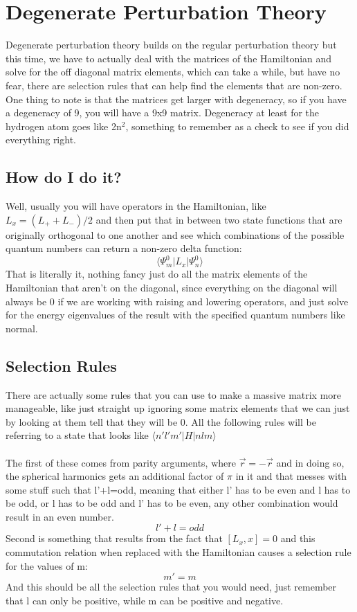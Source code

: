 \documentclass[garamond]{article}
\begin{document}
\section{Degenerate Perturbation Theory}
Degenerate perturbation theory builds on the regular perturbation theory but this time, we have to actually deal with the matrices of the Hamiltonian and solve for the off diagonal matrix elements, which can take a while, but have no fear, there are selection rules that can help find the elements that are non-zero. One thing to note is that the matrices get larger with degeneracy, so if you have a degeneracy of 9, you will have a 9x9 matrix. Degeneracy at least for the hydrogen atom goes like 2n$^2$, something to remember as a check to see if you did everything right.

\subsection{How do I do it?}
Well, usually you will have operators in the Hamiltonian, like $L_x=(L_++L_-)/2$ and then put that in between two state functions that are originally orthogonal to one another and see which combinations of the possible quantum numbers can return a non-zero delta function:
\begin{equation}
\langle \Psi_m^0 | L_x | \Psi_n^0\rangle
\end{equation}
That is literally it, nothing fancy just do all the matrix elements of the Hamiltonian that aren't on the diagonal, since everything on the diagonal will always be 0 if we are working with raising and lowering operators, and just solve for the energy eigenvalues of the result with the specified quantum numbers like normal.
\subsection{Selection Rules}
There are actually some rules that you can use to make a massive matrix more manageable, like just straight up ignoring some matrix elements that we can just by looking at them tell that they will be 0. All the following rules will be referring to a state that looks like $\langle n' l' m' |H|nlm\rangle$ \\
\\
The first of these comes from parity arguments, where $\vec{r}=-\vec{r}$ and in doing so, the spherical harmonics gets an additional factor of $\pi$ in it and that messes with some stuff such that l'+l=odd, meaning that either l' has to be even and l has to be odd, or l has to be odd and l' has to be even, any other combination would result in an even number.
\begin{equation}
l'+l=odd
\end{equation}
Second is something that results from the fact that $[L_x,x]=0$ and this commutation relation when replaced with the Hamiltonian causes a selection rule for the values of m:
\begin{equation}
m'=m
\end{equation}
And this should be all the selection rules that you would need, just remember that l can only be positive, while m can be positive and negative.
\end{document}
